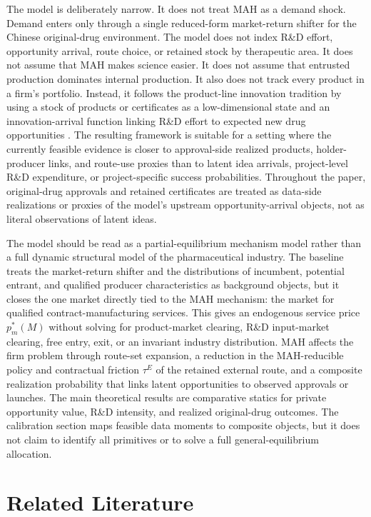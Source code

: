 \documentclass[12pt]{article}
\newcommand{\1}{\mathbf{1}}
\begin{document}
The model is deliberately narrow. It does not treat MAH as a demand shock. Demand enters only through a single reduced-form market-return shifter for the Chinese original-drug environment. The model does not index R\&D effort, opportunity arrival, route choice, or retained stock by therapeutic area. It does not assume that MAH makes science easier. It does not assume that entrusted production dominates internal production. It also does not track every product in a firm's portfolio. Instead, it follows the product-line innovation tradition by using a stock of products or certificates as a low-dimensional state and an innovation-arrival function linking R\&D effort to expected new drug opportunities \citep{KletteKortum2004}. The resulting framework is suitable for a setting where the currently feasible evidence is closer to approval-side realized products, holder-producer links, and route-use proxies than to latent idea arrivals, project-level R\&D expenditure, or project-specific success probabilities. Throughout the paper, original-drug approvals and retained certificates are treated as data-side realizations or proxies of the model's upstream opportunity-arrival objects, not as literal observations of latent ideas.

The model should be read as a partial-equilibrium mechanism model rather than a full dynamic structural model of the pharmaceutical industry. The baseline treats the market-return shifter and the distributions of incumbent, potential entrant, and qualified producer characteristics as background objects, but it closes the one market directly tied to the MAH mechanism: the market for qualified contract-manufacturing services. This gives an endogenous service price $p_m^*(M)$ without solving for product-market clearing, R\&D input-market clearing, free entry, exit, or an invariant industry distribution. MAH affects the firm problem through route-set expansion, a reduction in the MAH-reducible policy and contractual friction $\tau^E$ of the retained external route, and a composite realization probability that links latent opportunities to observed approvals or launches. The main theoretical results are comparative statics for private opportunity value, R\&D intensity, and realized original-drug outcomes. The calibration section maps feasible data moments to composite objects, but it does not claim to identify all primitives or to solve a full general-equilibrium allocation.

\section{Related Literature}
\end{document}
